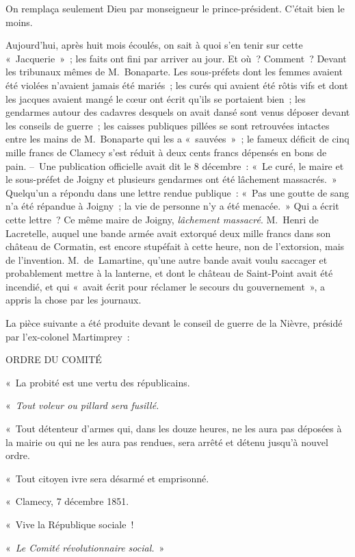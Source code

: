 \documentclass[french,twoside]{book} %
\newenvironment{quoteblock}%
  {\begin{quoting}}
  {\end{quoting}}
\newenvironment{quotebar}{%
    \def\FrameCommand{{\color{rubric!10!}\vrule width 0.5em} \hspace{0.9em}}%
    \def\OuterFrameSep{0pt} %
    \MakeFramed {\advance\hsize-\width \FrameRestore}
  }%
  {%
    \endMakeFramed
  }
\renewenvironment{quoteblock}%
  {%
    \savenotes
    \setstretch{0.9}
    \begin{quotebar}
    \smallskip
  }
  {%
    \smallskip
    \end{quotebar}
    \spewnotes
  }
\begin{document}
\noindent On remplaça seulement Dieu par monseigneur le prince-président. C’était bien le moins.\par
Aujourd’hui, après huit mois écoulés, on sait à quoi s’en tenir sur cette « Jacquerie » ; les faits ont fini par arriver au jour. Et où ? Comment ? Devant les tribunaux mêmes de M. Bonaparte. Les sous-préfets dont les femmes avaient été violées n’avaient jamais été mariés ; les curés qui avaient été rôtis vifs et dont les jacques avaient mangé le cœur ont écrit qu’ils se portaient bien ; les gendarmes autour des cadavres desquels on avait dansé sont venus déposer devant les conseils de guerre ; les caisses publiques pillées se sont retrouvées intactes entre les mains de M. Bonaparte qui les a « sauvées » ; le fameux déficit de cinq mille francs de Clamecy s’est réduit à deux cents francs dépensés en bons de pain. – Une publication officielle avait dit le 8 décembre : « Le curé, le maire et le sous-préfet de Joigny et plusieurs gendarmes ont été lâchement massacrés. » Quelqu’un a répondu dans une lettre rendue publique : « Pas une goutte de sang n’a été répandue à Joigny ; la vie de personne n’y a été menacée. » Qui a écrit cette lettre ? Ce même maire de Joigny, \emph{lâchement massacré}. M. Henri de Lacretelle, auquel une bande armée avait extorqué deux mille francs dans son château de Cormatin, est encore stupéfait à cette heure, non de l’extorsion, mais de l’invention. M. de Lamartine, qu’une autre bande avait voulu saccager et probablement mettre à la lanterne, et dont le château de Saint-Point avait été incendié, et qui « avait écrit pour réclamer le secours du gouvernement », a appris la chose par les journaux.\par
La pièce suivante a été produite devant le conseil de guerre de la Nièvre, présidé par l’ex-colonel Martimprey :\par

\begin{quoteblock}
 \noindent ORDRE DU COMITÉ\par
 « La probité est une vertu des républicains.\par
 « \emph{Tout voleur ou pillard sera fusillé.}\par
 « Tout détenteur d’armes qui, dans les douze heures, ne les aura pas déposées à la mairie ou qui ne les aura pas rendues, sera arrêté et détenu jusqu’à nouvel ordre.\par
 « Tout citoyen ivre sera désarmé et emprisonné.\par
 « Clamecy, 7 décembre 1851.\par
 « Vive la République sociale !\par
 « \emph{Le Comité révolutionnaire social.} »
 \end{quoteblock}
\end{document}
